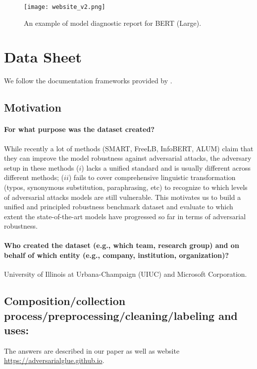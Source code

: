 \documentclass{article}
\begin{document}
\begin{figure}
    \centering
    \texttt{[image: website\_v2.png]}
    \caption{An example of model diagnostic report for BERT (Large).}
    \label{fig:report}
\end{figure}

\section{Data Sheet}
\label{appendix:datasheet}
We follow the documentation frameworks provided by \citet{datasheet}.

\subsection{Motivation}

\paragraph{For what purpose was the dataset created?}

While recently a lot of methods (SMART, FreeLB, InfoBERT, ALUM) claim that they can improve the model robustness against adversarial attacks, the adversary setup in these methods
($i$) lacks a unified standard and is usually different across different methods;
($ii$) fails to cover comprehensive linguistic transformation (typos, synonymous substitution, paraphrasing, etc) to recognize to which levels of adversarial attacks models are still vulnerable.
This motivates us to build a unified and principled robustness benchmark dataset and evaluate to which extent the state-of-the-art models have progressed so far in terms of adversarial robustness.


\paragraph{Who created the dataset (e.g., which team, research group) and on behalf of which entity (e.g., company, institution, organization)?} University of Illinois at Urbana-Champaign (UIUC) and Microsoft Corporation.


\subsection{Composition/collection process/preprocessing/cleaning/labeling and uses:}
The answers are described in our paper as well as website \url{https://adversarialglue.github.io}.
\end{document}
